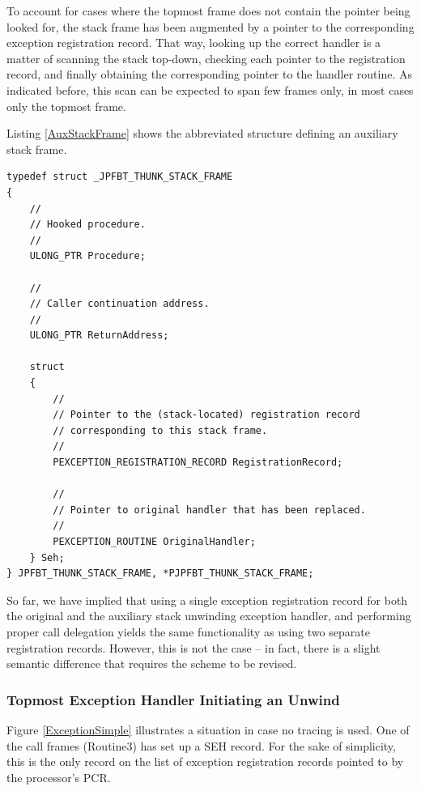 To account for cases where the topmost frame does not contain the pointer being
looked for, the stack frame has been augmented by a pointer to the corresponding
exception registration record. That way, looking up the correct handler is a matter
of scanning the stack top-down, checking each pointer to the registration record,
and finally obtaining the corresponding pointer to the handler routine. As indicated
before, this scan can be expected to span few frames only, in most cases only the 
topmost frame.

Listing \ref{AuxStackFrame} shows the abbreviated structure defining an auxiliary stack frame.

\begin{lstlisting}[label={AuxStackFrame}, caption={Definition of an auxiliary stack frame}]
typedef struct _JPFBT_THUNK_STACK_FRAME
{
	//
	// Hooked procedure.
	//
	ULONG_PTR Procedure;

	//
	// Caller continuation address.
	//
	ULONG_PTR ReturnAddress;

	struct
	{
		//
		// Pointer to the (stack-located) registration record
		// corresponding to this stack frame.
		//
		PEXCEPTION_REGISTRATION_RECORD RegistrationRecord;

		//
		// Pointer to original handler that has been replaced.
		//
		PEXCEPTION_ROUTINE OriginalHandler;
	} Seh;
} JPFBT_THUNK_STACK_FRAME, *PJPFBT_THUNK_STACK_FRAME;
\end{lstlisting}

So far, we have implied that using a single exception registration record
for both the original and the auxiliary stack unwinding exception handler,
and performing proper call delegation yields the same functionality as 
using two separate registration records. However, this is not the case -- in fact,
there is a slight semantic difference that requires the scheme to be revised.

\subsubsection{Topmost Exception Handler Initiating an Unwind}

Figure \ref{ExceptionSimple} illustrates a situation in case no tracing is used.
One of the call frames (Routine3) has set up a SEH record. For the sake of
simplicity, this is the only record on the list of exception registration records
pointed to by the processor's PCR.


